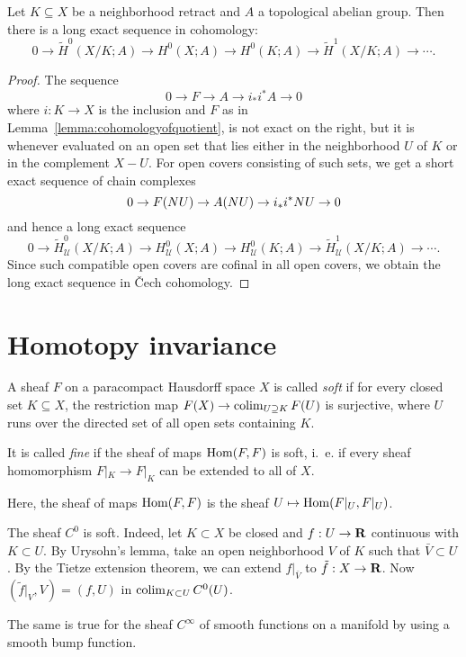 \documentclass[a4paper,openany]{scrbook}
\newcommand{\nerve}{\mathcal N}
\begin{document}
\begin{corollary}\label{cor:sesforspaces}
Let $K \subseteq X$ be a neighborhood retract and $A$ a topological abelian group. Then there is a long exact sequence in cohomology:
\[
0 \to \tilde H^0(X/K;A) \to H^0(X;A) \to H^0(K;A) \to \tilde H^1(X/K;A) \to \cdots.
\]
\end{corollary}
\begin{proof}
The sequence
\[
0 \to F \to A \to i_*i^*A \to 0
\]
where $i \colon K \to X$ is the inclusion and $F$ as in Lemma~\ref{lemma:cohomologyofquotient}, is not exact on the right, but it is whenever evaluated on an open set that lies either in the neighborhood $U$ of $K$ or in the complement $X-U$. For open covers consisting of such sets, we get a short exact sequence of chain complexes
\[
0 \to F(\mathcal \nerve U) \to A(\mathcal \nerve U) \to i_*i^*\mathcal \nerve U \to 0
\]
and hence a long exact sequence
\[
0 \to \tilde H^0_{\mathcal U}(X/K;A) \to H^0_{\mathcal U}(X;A) \to H^0_{\mathcal U}(K;A) \to \tilde H^1_{\mathcal U}(X/K;A) \to \cdots.
\]
Since such compatible open covers are cofinal in all open covers, we obtain the long exact sequence in \v Cech cohomology.
\end{proof}


\section{Homotopy invariance}
\begin{defn} A sheaf $F$ on a paracompact Hausdorff space $X$ is called \emph{soft} if for every closed set $K \subseteq X$, the restriction map $F(X) \to \operatorname*{colim}_{U \supseteq K} F(U)$ is surjective, where $U$ runs over the directed set of all open sets containing $K$.

It is called \emph{fine} if the sheaf of maps $\operatorname{Hom}(F,F)$ is soft, i.~e. if every sheaf homomorphism $F|_K \to F|_K$ can be extended to all of $X$.
\end{defn}
Here, the sheaf of maps $\operatorname{Hom}(F,F)$ is the sheaf $U \mapsto \operatorname{Hom}(F|_U,F|_U)$.

\begin{example}
The sheaf $C^0$ is soft. Indeed, let $K \subset X$ be closed and $f:U \to \mathbf R$ continuous with $K \subset U$. By Urysohn's lemma, take an open neighborhood $V$ of $K$ such that $\bar{V} \subset U$. By the Tietze extension theorem, we can extend $f|_{\bar{V}}$ to $\tilde{f}:X \to \mathbf R$. Now $(\tilde{f}|_V,V) = (f,U)$ in $\operatorname*{colim}_{K \subset U}C^0(U)$.

 The same is true for the sheaf $C^\infty$ of smooth functions on a manifold by using a smooth bump function.
\end{example}
\end{document}
